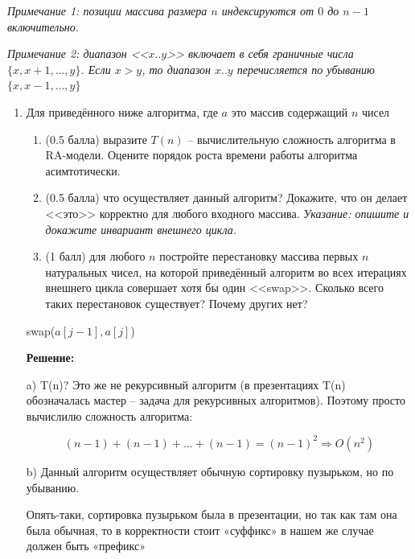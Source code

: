\documentclass[11pt,russian]{amsart}
\newcommand{\1}{\mathbb{1}}
\begin{document}
	\textit{Примечание 1: позиции массива размера $n$ индексируются от $0$ до $n-1$ включительно.}
	
	\textit{Примечание 2: диапазон <<$x..y$>> включает в себя граничные числа $\{x, x+1, ..., y\}$. Если $x > y$, то диапазон $x..y$ перечисляется по убыванию $\{x, x - 1, ..., y\}$}

	\vspace{.25\baselineskip}
	\begin{enumerate}[label={\arabic*.}]
		\item Для приведённого ниже алгоритма, где $a$ это массив содержащий $n$ чисел
		\begin{enumerate}
			\item (0.5 балла) выразите $T(n)$ -- вычислительную сложность алгоритма в RA-модели. Оцените порядок роста времени работы алгоритма асимтотически.			
			\item (0.5 балла) что осуществляет данный алгоритм? Докажите, что он делает <<это>> корректно для любого входного массива. \textit{Указание: опишите и докажите инвариант внешнего цикла.}
			\item (1 балл) для любого $n$ постройте перестановку массива первых $n$ натуральных чисел, на которой приведённый алгоритм во всех итерациях внешнего цикла совершает хотя бы один <<swap>>. Сколько всего таких перестановок существует? Почему других нет?
		\end{enumerate}
		
		\begin{algorithm}[H]
			\label{alg:bubble_sort}
			\begin{algorithmic}[1]
				\State swap($a[j-1], a[j]$)
				\EndIf
				\EndFor
				\EndFor
			\end{algorithmic}
		\end{algorithm}%
		
		\textbf{Решение:}
		
		a) T(n)? Это же не рекурсивный алгоритм (в презентациях T(n) обозначалась мастер – задача для рекурсивных алгоритмов). Поэтому просто вычислилю сложность алгоритма:
		
		\[(n - 1) + (n - 1) + \dots + (n - 1) = (n - 1)^2 \Rightarrow O(n^2)\]
		
		b) Данный алгоритм осуществляет обычную сортировку пузырьком, но по убыванию.
		
		Опять-таки, сортировка пузырьком была в презентации, но так как там она была обычная, то в корректности стоит «суффикс» в нашем же случае должен быть «префикс»
		

\end{enumerate}
\end{document}
